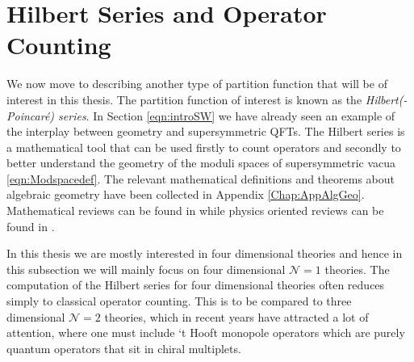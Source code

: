 \documentclass[main.tex]{subfiles}
\begin{document}
\section{Hilbert Series and Operator Counting}\label{sec:hibseriesintro}
We now move to describing another type of partition function that will be of interest in this thesis.  The partition function of interest is known as the \textit{Hilbert(-Poincar\'e) series}.  In Section \ref{eqn:introSW} we have already seen an example of the interplay between geometry and supersymmetric QFTs.  The Hilbert series is a mathematical tool that can be used firstly to count operators and secondly to better understand the geometry of the moduli spaces of supersymmetric vacua \eqref{eqn:Modspacedef}.
The relevant mathematical definitions and theorems about algebraic geometry have been collected in Appendix \ref{Chap:AppAlgGeo}.  Mathematical reviews can be found in \cite{Cox:2007,eisenbud1995commutative,rubei2014algebraic,alicemark} while physics oriented reviews can be found in \cite{Cremonesi:2017jrk,Forcella:2008bb,Bourget:2017sxr}.

In this thesis we are mostly interested in four dimensional theories and hence in this subsection we will mainly focus on four dimensional $\mathcal{N}=1$ theories.  The computation of the Hilbert series for four dimensional theories often reduces simply to classical operator counting.  This is to be compared to three dimensional $\mathcal{N}=2$ theories, which in recent years have attracted a lot of attention, where one must include `t Hooft monopole operators which are purely quantum operators that sit in chiral multiplets.  
\end{document}
